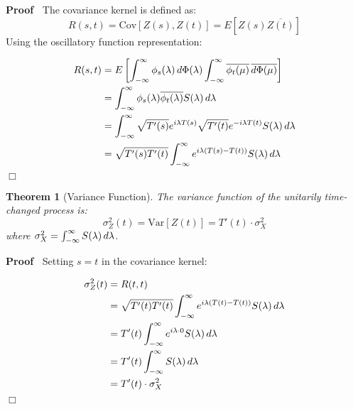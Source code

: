 \documentclass{article}
\newenvironment{proof}{\noindent\textbf{Proof\ }}{\hspace*{\fill}$\Box$\medskip}
\newtheorem{theorem}{Theorem}
\begin{document}
\begin{proof}
  The covariance kernel is defined as:
  \begin{equation}
    R (s, t) = \text{Cov} [Z (s), Z (t)] = E [Z (s) \overline{Z (t)}]
  \end{equation}
  Using the oscillatory function representation:
  
  \begin{align}
    R (s, t) & = E \left[ \int_{- \infty}^{\infty} \phi_s (\lambda)
    \hspace{0.17em} d \Phi (\lambda) \int_{- \infty}^{\infty} \overline{\phi_t
    (\mu)} \hspace{0.17em} \overline{d \Phi (\mu)} \right] \\
    & = \int_{- \infty}^{\infty} \phi_s (\lambda) \overline{\phi_t (\lambda)}
    S (\lambda)  \hspace{0.17em} d \lambda \\
    & = \int_{- \infty}^{\infty} \sqrt{T' (s)} e^{i \lambda T (s)}  \sqrt{T'
    (t)} e^{- i \lambda T (t)} S (\lambda)  \hspace{0.17em} d \lambda \\
    & = \sqrt{T' (s) T' (t)}  \int_{- \infty}^{\infty} e^{i \lambda (T (s) -
    T (t))} S (\lambda)  \hspace{0.17em} d \lambda 
  \end{align}
\end{proof}

\begin{theorem}
  [Variance Function] The variance function of the unitarily time-changed
  process is:
  \[ \sigma_Z^2 (t) = \text{Var} [Z (t)] = T' (t) \cdot \sigma_X^2 \]
  where $\sigma_X^2 = \int_{- \infty}^{\infty} S (\lambda)  \hspace{0.17em} d
  \lambda$.
\end{theorem}

\begin{proof}
  Setting $s = t$ in the covariance kernel:
  
  \begin{align}
    \sigma_Z^2 (t) & = R (t, t) \\
    & = \sqrt{T' (t) T' (t)}  \int_{- \infty}^{\infty} e^{i \lambda (T (t) -
    T (t))} S (\lambda)  \hspace{0.17em} d \lambda \\
    & = T' (t)  \int_{- \infty}^{\infty} e^{i \lambda \cdot 0} S (\lambda) 
    \hspace{0.17em} d \lambda \\
    & = T' (t)  \int_{- \infty}^{\infty} S (\lambda)  \hspace{0.17em} d
    \lambda \\
    & = T' (t) \cdot \sigma_X^2 
  \end{align}
\end{proof}
\end{document}
